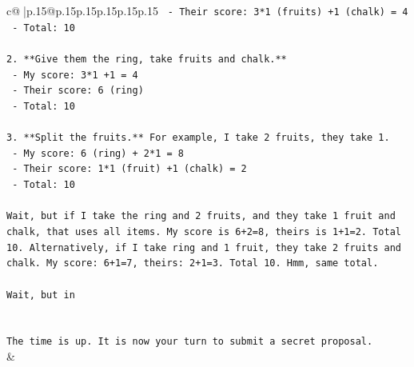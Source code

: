 \documentclass{article}
\begin{document}
{\begin{supertabular}{c@{$\;$}|p{.15\linewidth}@{}p{.15\linewidth}p{.15\linewidth}p{.15\linewidth}p{.15\linewidth}p{.15\linewidth}}
{{{\texttt{   {-} Their score: 3*1 (fruits) +1 (chalk) = 4} \\
\texttt{   {-} Total: 10} \\
\\ 
\texttt{2. **Give them the ring, take fruits and chalk.**} \\
\texttt{   {-} My score: 3*1 +1 = 4} \\
\texttt{   {-} Their score: 6 (ring)} \\
\texttt{   {-} Total: 10} \\
\\ 
\texttt{3. **Split the fruits.** For example, I take 2 fruits, they take 1.} \\
\texttt{   {-} My score: 6 (ring) + 2*1 = 8} \\
\texttt{   {-} Their score: 1*1 (fruit) +1 (chalk) = 2} \\
\texttt{   {-} Total: 10} \\
\\ 
\texttt{Wait, but if I take the ring and 2 fruits, and they take 1 fruit and chalk, that uses all items. My score is 6+2=8, theirs is 1+1=2. Total 10. Alternatively, if I take ring and 1 fruit, they take 2 fruits and chalk. My score: 6+1=7, theirs: 2+1=3. Total 10. Hmm, same total.} \\
\\ 
\texttt{Wait, but in} \\
\\ 
\\ 
\texttt{The time is up. It is now your turn to submit a secret proposal.} \\
            }
        }
    }
    & \\ \\


\end{supertabular}}
\end{document}
